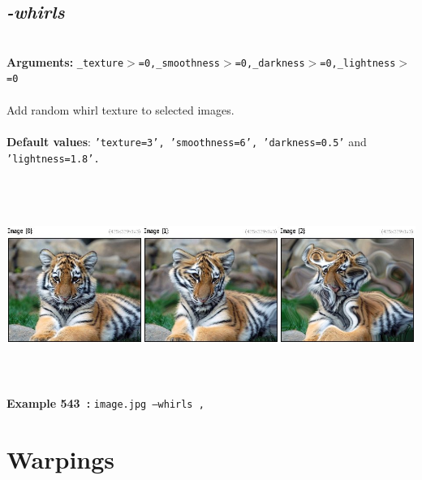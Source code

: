 \documentclass[a4paper,11pt,twoside]{book}
\begin{document}
\subsection{\emph{-whirls} }\vspace*{-0.5em}
~\\\textbf{Arguments: } 
{\small \texttt{\_texture$>$=0,\_smoothness$>$=0,\_darkness$>$=0,\_lightness$>$=0}}\\~\\
Add random whirl texture to selected images.
~\\~\\\textbf{Default values}: {\small \texttt{'texture=3', 'smoothness=6', 'darkness=0.5'} and \texttt{'lightness=1.8'.}}
\begin{center}\includegraphics[keepaspectratio=true,height=7cm,width=\textwidth]{img/gmic_def543.jpg}\\
{\footnotesize \textbf{Example 543~:} \texttt{image.jpg --whirls ,}}
\end{center}
\section{Warpings}
\end{document}
